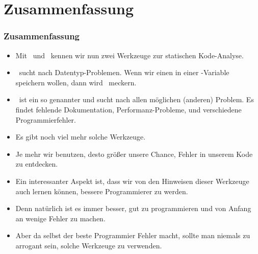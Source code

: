 \documentclass[aspectratio=169,mathserif,notheorems]{beamer}%
\begin{document}
\section{Zusammenfassung}%
%
\begin{frame}%
\frametitle{Zusammenfassung}%
\begin{itemize}%
\item Mit \ruff\ und \mypy\ kennen wir nun zwei Werkzeuge zur statischen Kode-Analyse.%
%
\item<2-> \mypy\ sucht nach Datentyp-Problemen. Wenn wir einen  in einer -Variable speichern wollen, dann wird \mypy\ meckern.%
%
\item<3-> \ruff\ ist ein so genannter  und sucht nach allen möglichen (anderen) Problem. Es findet fehlende Dokumentation, Performanz-Probleme, und verschiedene Programmierfehler.%
%
\item<4-> Es gibt noch viel mehr solche Werkzeuge.%
%
\item<5-> Je mehr wir benutzen, desto größer unsere Chance, Fehler in unserem Kode zu entdecken.%
%
\item<6-> Ein interessanter Aspekt ist, dass wir von den Hinweisen dieser Werkzeuge auch lernen können, bessere Programmierer zu werden.%
%
\item<7-> Denn natürlich ist es immer besser, gut zu programmieren und von Anfang an wenige Fehler zu machen.%
%
\item<8-> Aber da selbst der beste Programmier Fehler macht, sollte man niemals zu arrogant sein, solche Werkzeuge zu verwenden.%
%
\end{itemize}%
\end{frame}%
%
\endPresentation%
\end{document}

